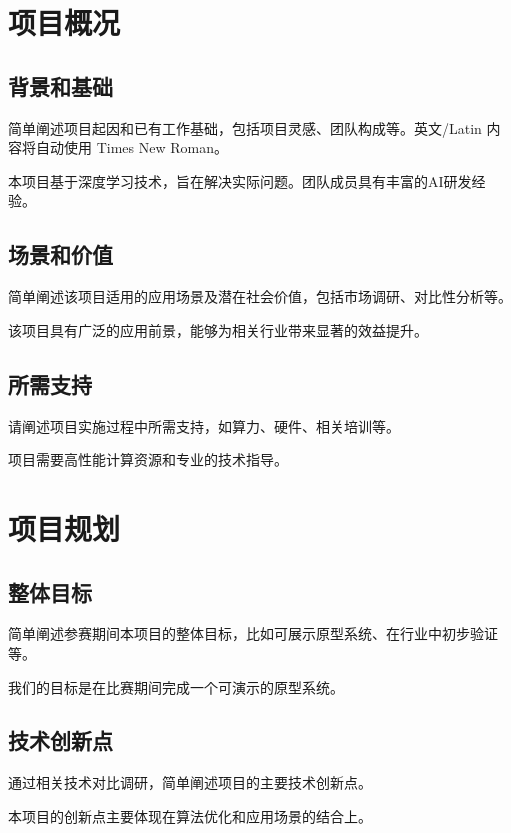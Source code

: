 \documentclass{cpipc}
\begin{document}
\maketitlepage

\makemycontents

\changehistory

\startmain

\section{项目概况}

\subsection{背景和基础}
{\BodyText
\FirstParagraph 简单阐述项目起因和已有工作基础，包括项目灵感、团队构成等。英文/Latin 内容将自动使用 Times New Roman。

\NextParagraph 本项目基于深度学习技术，旨在解决实际问题。团队成员具有丰富的AI研发经验。
}

\subsection{场景和价值}
{\BodyText
\FirstParagraph 简单阐述该项目适用的应用场景及潜在社会价值，包括市场调研、对比性分析等。

\NextParagraph 该项目具有广泛的应用前景，能够为相关行业带来显著的效益提升。
}

\subsection{所需支持}
{\BodyText
\FirstParagraph 请阐述项目实施过程中所需支持，如算力、硬件、相关培训等。

\NextParagraph 项目需要高性能计算资源和专业的技术指导。
}

\section{项目规划}
\subsection{整体目标}
{\BodyText
\FirstParagraph 简单阐述参赛期间本项目的整体目标，比如可展示原型系统、在行业中初步验证等。

\NextParagraph 我们的目标是在比赛期间完成一个可演示的原型系统。
}

\subsection{技术创新点}
{\BodyText
\FirstParagraph 通过相关技术对比调研，简单阐述项目的主要技术创新点。

\NextParagraph 本项目的创新点主要体现在算法优化和应用场景的结合上。
}
\end{document}
